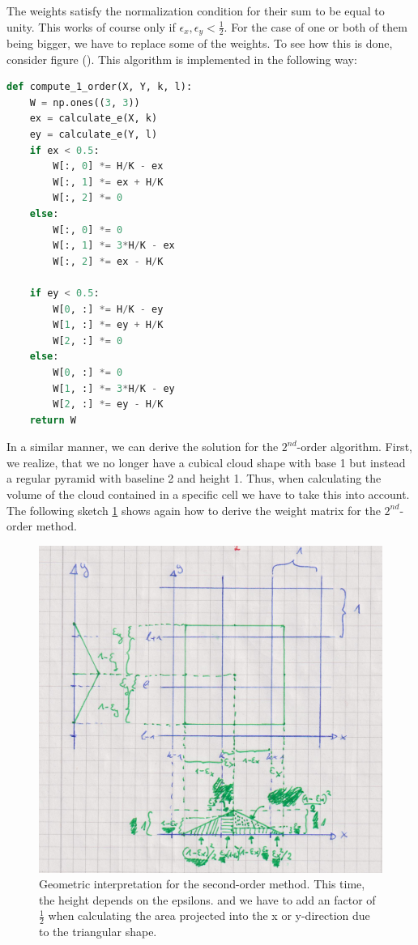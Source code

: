 \documentclass{scrartcl}
\begin{document}
The weights satisfy the normalization condition for their sum to be equal to unity. This works of course only if \( \epsilon_x, \epsilon_y < \frac{1}{2}\). For the case of one or both of them being bigger, we have to replace some of the weights. To see how this is done, consider figure ().
This algorithm is implemented in the following way:
\begin{lstlisting}[title=Function to calculate the 1st order., language=Python, frame=single]
def compute_1_order(X, Y, k, l):
	W = np.ones((3, 3))
	ex = calculate_e(X, k)
	ey = calculate_e(Y, l)
	if ex < 0.5:
		W[:, 0] *= H/K - ex
		W[:, 1] *= ex + H/K
		W[:, 2] *= 0
	else:
		W[:, 0] *= 0
		W[:, 1] *= 3*H/K - ex
		W[:, 2] *= ex - H/K
	
	if ey < 0.5:
		W[0, :] *= H/K - ey
		W[1, :] *= ey + H/K
		W[2, :] *= 0
	else:
		W[0, :] *= 0
		W[1, :] *= 3*H/K - ey
		W[2, :] *= ey - H/K
	return W
\end{lstlisting}
In a similar manner, we can derive the solution for the \( 2^{nd} \)-order algorithm. First, we realize, that we no longer have a cubical cloud shape with base 1 but instead a regular pyramid with baseline 2 and height 1. Thus, when calculating the volume of the cloud contained in a specific cell we have to take this into account. \\The following sketch \ref{fig:sketch02} shows again how to derive the weight matrix for the \( 2^{nd} \)-order method.
\begin{figure}[h]
	\centering
	\includegraphics[width=0.7\linewidth]{Plots/sketch02}
	\caption{Geometric interpretation for the second-order method. This time, the height depends on the epsilons. and we have to add an factor of \( \frac{1}{2} \) when calculating the area projected into the x or y-direction due to the triangular shape.}
	\label{fig:sketch02}
\end{figure}
\end{document}
